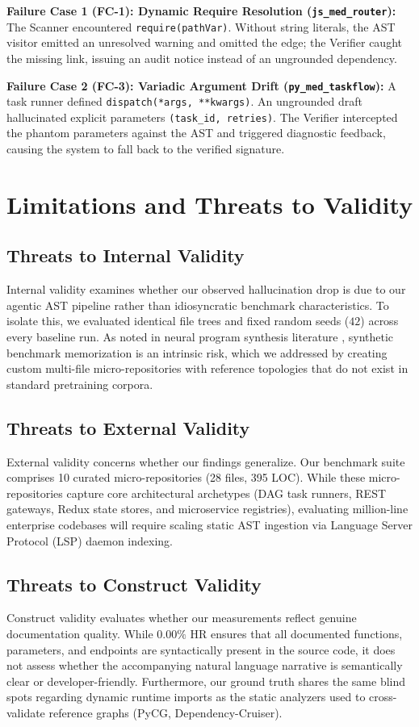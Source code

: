\documentclass[conference]{IEEEtran}
\begin{document}
\textbf{Failure Case 1 (FC-1): Dynamic Require Resolution (\texttt{js\_med\_router}):}
The Scanner encountered \texttt{require(pathVar)}. Without string literals, the AST visitor emitted an unresolved warning and omitted the edge; the Verifier caught the missing link, issuing an audit notice instead of an ungrounded dependency.

\textbf{Failure Case 2 (FC-3): Variadic Argument Drift (\texttt{py\_med\_taskflow}):}
A task runner defined \texttt{dispatch(*args, **kwargs)}. An ungrounded draft hallucinated explicit parameters \texttt{(task\_id, retries)}. The Verifier intercepted the phantom parameters against the AST and triggered diagnostic feedback, causing the system to fall back to the verified signature.

\section{Limitations and Threats to Validity}

\subsection{Threats to Internal Validity}
Internal validity examines whether our observed hallucination drop is due to our agentic AST pipeline rather than idiosyncratic benchmark characteristics. To isolate this, we evaluated identical file trees and fixed random seeds ($42$) across every baseline run. As noted in neural program synthesis literature \cite{rabin2021program}, synthetic benchmark memorization is an intrinsic risk, which we addressed by creating custom multi-file micro-repositories with reference topologies that do not exist in standard pretraining corpora.

\subsection{Threats to External Validity}
External validity concerns whether our findings generalize. Our benchmark suite comprises 10 curated micro-repositories (28 files, 395 LOC). While these micro-repositories capture core architectural archetypes (DAG task runners, REST gateways, Redux state stores, and microservice registries), evaluating million-line enterprise codebases will require scaling static AST ingestion via Language Server Protocol (LSP) daemon indexing.

\subsection{Threats to Construct Validity}
Construct validity evaluates whether our measurements reflect genuine documentation quality. While $0.00\%$ HR ensures that all documented functions, parameters, and endpoints are syntactically present in the source code, it does not assess whether the accompanying natural language narrative is semantically clear or developer-friendly. Furthermore, our ground truth shares the same blind spots regarding dynamic runtime imports as the static analyzers used to cross-validate reference graphs (PyCG, Dependency-Cruiser).
\end{document}
